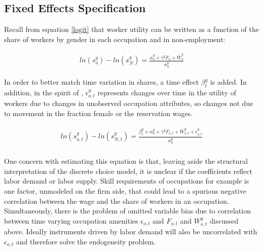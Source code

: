 \documentclass[11pt]{article}
\begin{document}
 \subsection{Fixed Effects Specification}
 
%

Recall from equation \ref{logit} that worker utility can be written as a function of the share of workers by gender in each occupation and in non-employment:

\begin{align}
     ln(s^g_o) - ln(s^g_N) = \frac{\alpha^{g}_o + \gamma^g F_o + \bar{W}^g_o}{ \sigma^g_{\eta} }
\end{align}
 

In order to better match time variation in shares, a time effect $\beta^g_t$ is added. In addition, in the spirit of , $\epsilon^g_{o,t}$ represents changes over time in the utility of workers due to changes in unobserved occupation attributes, so changes not due to movement in the fraction female or the reservation wages.

\begin{align*}
ln(s^g_{o,t}) - ln(s^g_{N,t}) =   \frac{ \beta^g_t + \alpha^g_o +  \gamma^g F_{o,t} +  \bar{W}^g_{o,t} + \epsilon^g_{o,t}}{\sigma^g_{\eta}}  \\
\end{align*}

One concern with estimating this equation is that, leaving aside the structural interpretation of the discrete choice model, it is unclear if the coefficients reflect labor demand or labor supply. Skill requirements of occupations for example is one factor, unmodeled on the firm side, that could lead to a spurious negative correlation between the wage and the share of workers in an occupation. Simultaneously, there is the problem of omitted variable bias due to correlation between time varying occupation amenities $\epsilon_{o,t}$ and $F_{o,t}$ and $W^g_{o,t}$ discussed above. Ideally instruments driven by labor demand will also be uncorrelated with $\epsilon_{o,t}$ and therefore solve the endogeneity problem.
\end{document}
